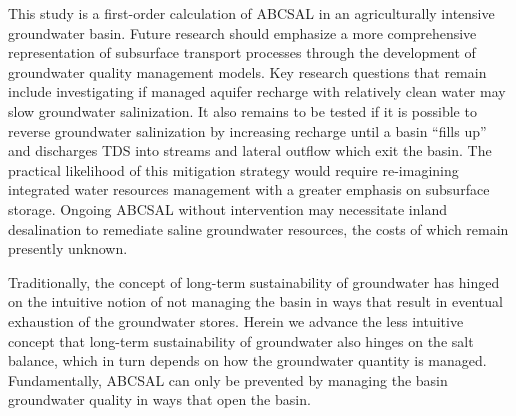 This study is a first-order calculation of ABCSAL in an agriculturally intensive groundwater basin. Future research should emphasize a more comprehensive representation of subsurface transport processes through the development of groundwater quality management models. Key research questions that remain include investigating if managed aquifer recharge with relatively clean water may slow groundwater salinization. It also remains to be tested if it is possible to reverse groundwater salinization by increasing recharge until a basin ``fills up'' and discharges TDS into streams and lateral outflow which exit the basin. The practical likelihood of this mitigation strategy would require re-imagining integrated water resources management with a greater emphasis on subsurface storage. Ongoing ABCSAL without intervention may necessitate inland desalination to remediate saline groundwater resources, the costs of which remain presently unknown.  

Traditionally, the concept of long-term sustainability of groundwater has hinged on the intuitive notion of not managing the basin in ways that result in eventual exhaustion of the groundwater stores. Herein we advance the less intuitive concept that long-term sustainability of groundwater also hinges on the salt balance, which in turn depends on how the groundwater quantity is managed. Fundamentally, ABCSAL can only be prevented by managing the basin groundwater quality in ways that open the basin.  


\clearpage

